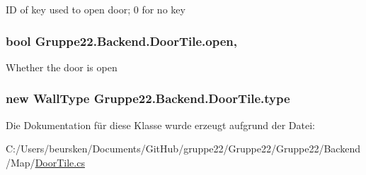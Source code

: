 I\-D of key used to open door; 0 for no key 

\hypertarget{class_gruppe22_1_1_backend_1_1_door_tile_a60d950d342a856d8976fc1c33b9e6f67}{
\subsubsection[{open}]{\setlength{\rightskip}{0pt plus 5cm}bool Gruppe22.\-Backend.\-Door\-Tile.\-open\hspace{0.3cm}{\ttfamily [get]}, {\ttfamily [set]}}}\label{class_gruppe22_1_1_backend_1_1_door_tile_a60d950d342a856d8976fc1c33b9e6f67}


Whether the door is open 

\hypertarget{class_gruppe22_1_1_backend_1_1_door_tile_a3c4f4816429758d9006495f23477d8e4}{
\subsubsection[{type}]{\setlength{\rightskip}{0pt plus 5cm}new {\bf Wall\-Type} Gruppe22.\-Backend.\-Door\-Tile.\-type\hspace{0.3cm}{\ttfamily [get]}}}\label{class_gruppe22_1_1_backend_1_1_door_tile_a3c4f4816429758d9006495f23477d8e4}


Die Dokumentation für diese Klasse wurde erzeugt aufgrund der Datei\-:\begin{DoxyCompactItemize}
\item 
C\-:/\-Users/beursken/\-Documents/\-Git\-Hub/gruppe22/\-Gruppe22/\-Gruppe22/\-Backend/\-Map/\hyperlink{_door_tile_8cs}{Door\-Tile.\-cs}\end{DoxyCompactItemize}
